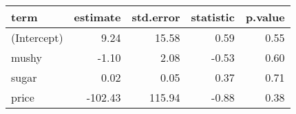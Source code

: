 \begin{tabular}{lrrrr}
  \hline
term & estimate & std.error & statistic & p.value \\ 
  \hline
(Intercept) & 9.24 & 15.58 & 0.59 & 0.55 \\ 
  mushy & -1.10 & 2.08 & -0.53 & 0.60 \\ 
  sugar & 0.02 & 0.05 & 0.37 & 0.71 \\ 
  price & -102.43 & 115.94 & -0.88 & 0.38 \\ 
   \hline
\end{tabular}
